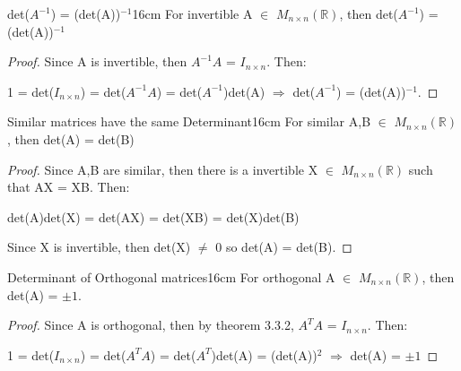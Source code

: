     \vspace{0.5cm}



    \begin{corollary}{det($A^{-1}$) = (det(A))$^{-1}$}{16cm}
        For invertible A $\in$ $M_{n \times n}(\mathbb{R})$,
        then det($A^{-1}$) = (det(A))$^{-1}$
    \end{corollary}

    \begin{proof}
        Since A is invertible, then $A^{-1}A$ = $I_{n \times n}$. Then:

        \hspace{0.5cm}
        1 = det($I_{n \times n}$)
        = det($A^{-1}A$)
        = det($A^{-1}$)det(A)
        \hspace{0.5cm}
        $\Rightarrow$
        \hspace{0.5cm}
        det($A^{-1}$) = (det(A))$^{-1}$.
    \end{proof}

    \newpage



    \begin{corollary}{Similar matrices have the same Determinant}{16cm}
        For similar A,B $\in$ $M_{n \times n}(\mathbb{R})$,
        then det(A) = det(B)
    \end{corollary}

    \begin{proof}
        Since A,B are similar, then there is a invertible
        X $\in$ $M_{n \times n}(\mathbb{R})$ such that AX = XB. Then:

        \hspace{0.5cm}
        det(A)det(X)
        = det(AX)
        = det(XB)
        = det(X)det(B)

        Since X is invertible, then det(X) $\not =$ 0 so det(A) = det(B).
    \end{proof}

    \vspace{0.5cm}



    \begin{corollary}{Determinant of Orthogonal matrices}{16cm}
        For orthogonal A $\in$ $M_{n \times n}(\mathbb{R})$,
        then det(A) = $\pm 1$.
    \end{corollary}

    \begin{proof}
        Since A is orthogonal, then by {\color{red} theorem 3.3.2},
        $A^TA$ = $I_{n \times n}$. Then:

        \hspace{0.5cm}
        1 = det($I_{n \times n}$)
        = det($A^TA$)
        = det($A^T$)det(A)
        = (det(A))$^2$
        \hspace{0.5cm}
        $\Rightarrow$
        \hspace{0.5cm}
        det(A) = $\pm 1$
    \end{proof}

